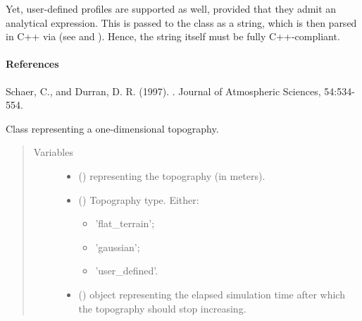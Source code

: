 \documentclass[letterpaper,10pt,english]{sphinxmanual}
\begin{document}
Yet, user-defined profiles are supported as well, provided that they admit an analytical expression.
This is passed to the class as a string, which is then parsed in C++ via 
(see  and ). Hence, the string itself must be
fully C++-compliant.
\paragraph{References}

Schaer, C., and Durran, D. R. (1997). . Journal of Atmospheric Sciences, 54:534-554.

\begin{fulllineitems}
\label{\detokenize{api:tasmania.grids.topography.Topography1d}}
Class representing a one-dimensional topography.
\begin{quote}\begin{description}
\item[{Variables}] \leavevmode\begin{itemize}
\item {} 
 () \textendash{}  representing the topography (in meters).

\item {} 
 () \textendash{} 
Topography type. Either:
\begin{itemize}
\item {} 
’flat\_terrain’;

\item {} 
’gaussian’;

\item {} 
’user\_defined’.

\end{itemize}


\item {} 
 () \textendash{}  object representing the elapsed simulation time after which the topography
should stop increasing.


\end{itemize}
\end{description}
\end{quote}
\end{fulllineitems}
\end{document}
